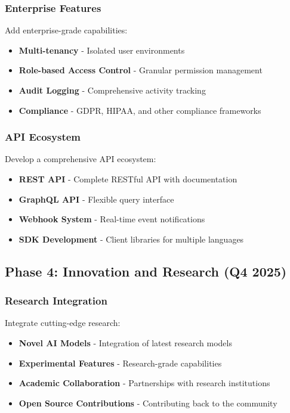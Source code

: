 \documentclass[11pt]{article}
\begin{document}
\subsubsection{Enterprise Features}

Add enterprise-grade capabilities:

\begin{itemize}
\item \textbf{Multi-tenancy} - Isolated user environments
\item \textbf{Role-based Access Control} - Granular permission management
\item \textbf{Audit Logging} - Comprehensive activity tracking
\item \textbf{Compliance} - GDPR, HIPAA, and other compliance frameworks
\end{itemize}

\subsubsection{API Ecosystem}

Develop a comprehensive API ecosystem:

\begin{itemize}
\item \textbf{REST API} - Complete RESTful API with documentation
\item \textbf{GraphQL API} - Flexible query interface
\item \textbf{Webhook System} - Real-time event notifications
\item \textbf{SDK Development} - Client libraries for multiple languages
\end{itemize}

\subsection{Phase 4: Innovation and Research (Q4 2025)}

\subsubsection{Research Integration}

Integrate cutting-edge research:

\begin{itemize}
\item \textbf{Novel AI Models} - Integration of latest research models
\item \textbf{Experimental Features} - Research-grade capabilities
\item \textbf{Academic Collaboration} - Partnerships with research institutions
\item \textbf{Open Source Contributions} - Contributing back to the community
\end{itemize}
\end{document}

